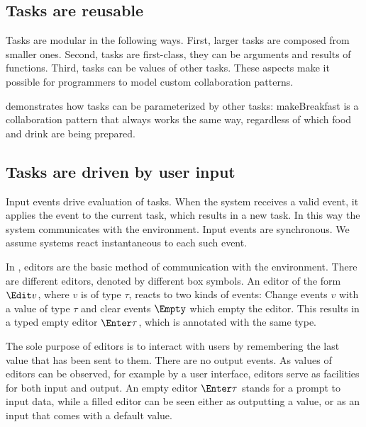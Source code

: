 \subsection{Tasks are reusable}

Tasks are modular in the following ways.
First, larger tasks are composed from smaller ones.
Second, tasks are first-class, they can be arguments and results of functions.
Third, tasks can be values of other tasks.
These aspects make it possible for programmers to model custom collaboration patterns.

 demonstrates how tasks can be parameterized by other tasks: makeBreakfast is a collaboration pattern that always works the same way, regardless of which food and drink are being prepared.


\subsection{Tasks are driven by user input}


Input events drive evaluation of tasks.
When the system receives a valid event, it applies the event to the current task, which results in a new task.
In this way the system communicates with the environment.
Input events are synchronous.
We assume systems react instantaneous to each such event.

In \TOPHAT, editors are the basic method of communication with the environment.
There are different editors, denoted by different box symbols.
An editor of the form $\Edit v$, where $v$ is of type $\tau$, reacts to two kinds of events:
Change events $v$ with a value of type $\tau$ and clear events $\Empty$ which empty the editor.
This results in a typed empty editor $\Enter \tau$, which is annotated with the same type.

The sole purpose of editors is to interact with users by remembering the last value that has been sent to them.
There are no output events.
As values of editors can be observed, for example by a user interface, editors serve as facilities for both input and output.
An empty editor $\Enter \tau$ stands for a prompt to input data, while a filled editor can be seen either as outputting a value, or as an input that comes with a default value.

